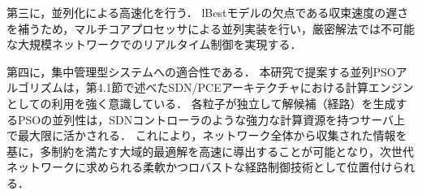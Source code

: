 第三に，並列化による高速化を行う．
lBestモデルの欠点である収束速度の遅さを補うため，マルチコアプロセッサによる並列実装を行い，厳密解法では不可能な大規模ネットワークでのリアルタイム制御を実現する．

第四に，集中管理型システムへの適合性である．
本研究で提案する並列PSOアルゴリズムは，第4.1節で述べたSDN/PCEアーキテクチャにおける計算エンジンとしての利用を強く意識している．
各粒子が独立して解候補（経路）を生成するPSOの並列性は，SDNコントローラのような強力な計算資源を持つサーバ上で最大限に活かされる．
これにより，ネットワーク全体から収集された情報を基に，多制約を満たす大域的最適解を高速に導出することが可能となり，次世代ネットワークに求められる柔軟かつロバストな経路制御技術として位置付けられる．
